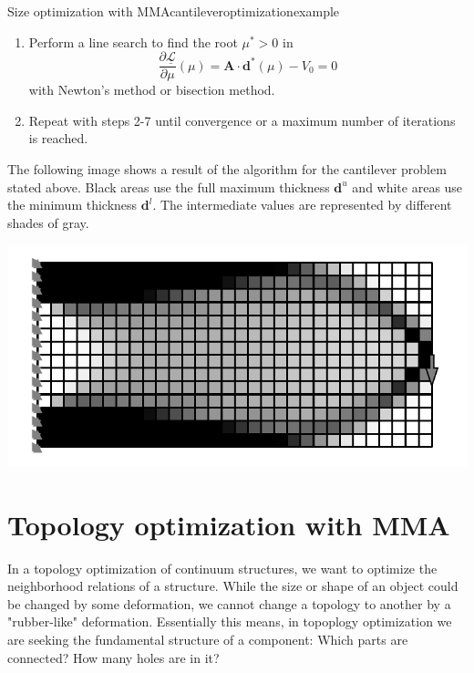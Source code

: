 \begin{example}{Size optimization with MMA}{cantileveroptimizationexample}
\begin{enumerate}
\begin{align}
{{                (L^k_j-d^k_j)^2}{\mu A_j}} \\
                \mathbf{d}^* (\mu) &= \max\left(\tilde{\mathbf{d}}^{l,k}, \min \left(\hat{\mathbf{d}}(\mu), \mathbf{d}_u \right)\right)
            \end{align}
        \item Perform a line search to find the root $\mu^*>0$ in 
        \begin{equation}
            \frac{\partial \underline{\mathcal{L}}}{\partial \mu}(\mu) = \mathbf{A} \cdot \mathbf{d}^* (\mu) - V_0  = 0
        \end{equation}
        with Newton's method or bisection method. 
        \item Repeat with steps 2-7 until convergence or a maximum number of iterations is reached.
    \end{enumerate}

    The following image shows a result of the algorithm for the cantilever problem stated above. Black areas use the full maximum thickness $\mathbf{d}^u$ and white areas use the minimum thickness $\mathbf{d}^l$. The intermediate values are represented by different shades of gray.

    \begin{center}
        \includegraphics[width=\linewidth]{figures/cantilever_fem_optimized.pdf}
    \end{center}
    
\end{example}

\section{Topology optimization with MMA}
In a topology optimization of continuum structures, we want to optimize the neighborhood relations of a structure. While the size or shape of an object could be changed by some deformation, we cannot change a topology to another by a "rubber-like" deformation. Essentially this means, in topoplogy optimization we are seeking the fundamental structure of a component: Which parts are connected? How many holes are in it? 

